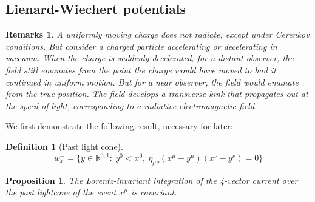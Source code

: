 \documentclass[a4paper]{article}
\newtheorem{remarks}{Remarks}[section]
\theoremstyle{new}
\newtheorem{defi}{Definition}[section]
\newtheorem{prop}{Proposition}[section]
\begin{document}
\subsection{Lienard-Wiechert potentials}
\begin{remarks}
A uniformly moving charge does not radiate, except under Cerenkov conditions. But consider a charged particle accelerating or decelerating in vaccuum. When the charge is suddenly decelerated, for a distant observer, the field still emanates from the point the charge would have moved to had it continued in uniform motion. But for a near observer, the field would emanate from the true position. The field develops a transverse kink that propagates out at the speed of light, corresponding to a radiative electromagnetic field.
\end{remarks}
We first demonstrate the following result, necessary for later:
\begin{defi}[Past light cone]
$$w_x^-=\{y\in\mathbb{R}^{3,1}:~y^0<x^0,~\eta_{\mu\nu}(x^\mu-y^\mu)(x^\nu-y^\nu)=0\}$$
\end{defi}
\begin{prop}
The Lorentz-invariant integration of the 4-vector current over the past lightcone of the event $x^\mu$ is covariant.
\end{prop}
\end{document}

